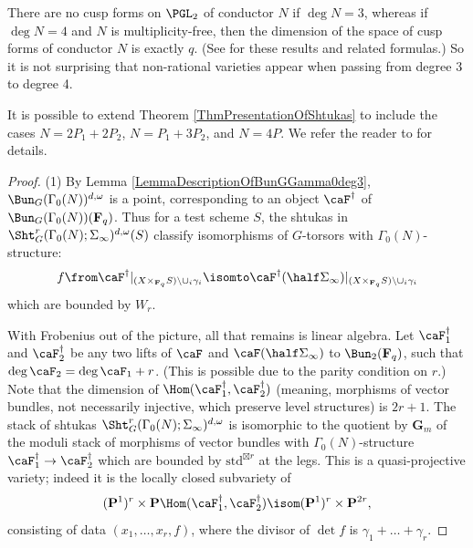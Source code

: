 \documentclass{article}
\def\F{\mathbf{F}}
\def\P{\mathbf{P}}
\begin{document}
\begin{rmk}  There are no cusp forms on $\PGL_2$ of conductor $N$ if $\deg N=3$, whereas if $\deg N=4$ and $N$ is multiplicity-free, then the dimension of the space of cusp forms of conductor $N$ is exactly $q$.  (See \cite[\S 7]{DeligneFlicker} for these results and related formulas.) So it is not surprising that non-rational varieties appear when passing from degree 3 to degree 4.
\end{rmk}

\begin{rmk} It is possible to extend Theorem \ref{ThmPresentationOfShtukas} to include the cases $N=2P_1+2P_2$, $N=P_1+3P_2$, and $N=4P$.   We refer the reader to \cite{Fernandez} for details.
\end{rmk}

\begin{proof} 
(1) By Lemma \ref{LemmaDescriptionOfBunGGamma0deg3}, $\Bun_G(\Gamma_0(N))^{d,\omega}$ is a point, corresponding to an object $\caF^\dagger$ of $\Bun_G(\Gamma_0(N))(\F_q)$.  Thus for a test scheme $S$, the shtukas in $\Sht_G^r(\Gamma_0(N);\Sigma_\infty)^{d,\omega}(S)$ classify isomorphisms of $G$-torsors with $\Gamma_0(N)$-structure:
\[ f\from \caF^\dagger\vert_{(X\times_{\F_q} S) \backslash \cup_i \gamma_i}  \isomto \caF^\dagger(\half \Sigma_\infty) \vert_{(X\times_{\F_q} S) \backslash \cup_i \gamma_i}
\]
which are bounded by $W_r$.  

With Frobenius out of the picture, all that remains is linear algebra.   Let $\caF_1^\dagger$ and $\caF_2^\dagger$ be any two lifts of $\caF$ and $\caF(\half \Sigma_\infty)$ to $\Bun_2(\F_q)$, such that $\deg \caF_2=\deg \caF_1+r$.  (This is possible due to the parity condition on $r$.)  Note that the dimension of $\Hom(\caF_1^\dagger,\caF_2^\dagger)$ (meaning, morphisms of vector bundles, not necessarily injective, which preserve level structures) is $2r+1$.  
The stack of shtukas $\Sht_G^r(\Gamma_0(N);\Sigma_\infty)^{d,\omega}$ is isomorphic to the quotient by $\mathbf{G}_m$ of the moduli stack of morphisms of vector bundles with $\Gamma_0(N)$-structure $\caF_1^\dagger\to \caF_2^\dagger$ which are bounded by $\mathrm{std}^{\boxtimes r}$ at the legs.  This is a quasi-projective variety;  indeed it is the locally closed subvariety of 
\[ (\P^1)^r\times \P\Hom(\caF_1^\dagger,\caF_2^\dagger)\isom (\P^1)^r\times \P^{2r}, \]
consisting of data $(x_1,\dots,x_r,f)$, where the divisor of $\det f$ is $\gamma_1+\dots+\gamma_r$.  


\end{proof}
\end{document}
